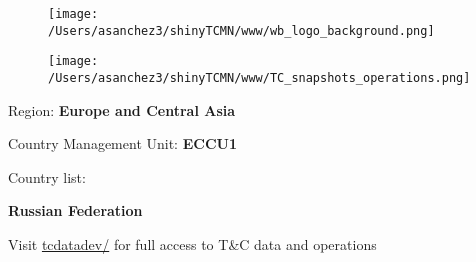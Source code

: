 \documentclass{article}\usepackage[]{graphicx}\usepackage[]{color}
\begin{document}
\begin{figure}
  \vspace{-3ex} %
  \hspace{-7ex} %
  \texttt{[image: /Users/asanchez3/shinyTCMN/www/wb\_logo\_background.png]}
\end{figure}
\begin{figure}
  \begin{minipage}[t]{0.99\textwidth} %
      \vspace{-30ex}
      \hspace{-2ex}
      \raggedright{\texttt{[image: /Users/asanchez3/shinyTCMN/www/TC\_snapshots\_operations.png]}}
  \end{minipage}
\end{figure}

\vspace{2ex}
\raggedright{\Large Region: \color{white!30!blue} \textbf{\Large Europe and Central Asia}}

\vspace{2ex}
\raggedright{\Large Country Management Unit: \color{white!30!blue} \textbf{ECCU1}}

\vspace{2ex}
\raggedright{\Large Country list:}  

\vspace{2ex}

\raggedright{\textbf{\Large \color{white!30!blue}Russian Federation\\
 }}

\vspace{10ex}
\raggedright{\large Visit \href{http://tcdatadev/}{\Large tcdatadev/} for full access to T\&C data and operations}

%
\end{document}
